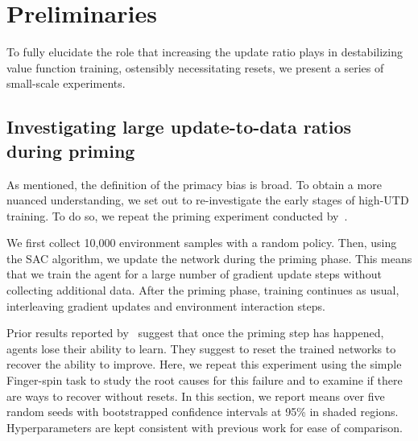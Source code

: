 \section{Preliminaries} \label{sec:overestimation:preliminaries}

To fully elucidate the role that increasing the update ratio plays in destabilizing value function training, ostensibly necessitating resets, we present a series of small-scale experiments.

\subsection{Investigating large update-to-data ratios during priming} \label{sec:overestimation:investigating}


As mentioned, the definition of the primacy bias is broad.
To obtain a more nuanced understanding, we set out to re-investigate the early stages of high-UTD training. To do so, we repeat the priming experiment conducted by~\textcite{nikishin2022primacy}.

We first collect 10,000 environment samples with a random policy. 
Then, using the SAC algorithm, we update the network during the priming phase.
This means that we train the agent for a large number of gradient update steps without collecting additional data.
After the priming phase, training continues as usual, interleaving gradient updates and environment interaction steps.

Prior results reported by~\textcite{nikishin2022primacy} suggest that once the priming step has happened, agents lose their ability to learn.
They suggest to reset the trained networks to recover the ability to improve.
Here, we repeat this experiment using the simple Finger-spin task \parencite{tunyasuvunakool2020dmcontrol} to study the root causes for this failure and to examine if there are ways to recover without resets.
In this section, we report means over five random seeds with bootstrapped confidence intervals at 95\% in shaded regions. 
Hyperparameters are kept consistent with previous work for ease of comparison.

